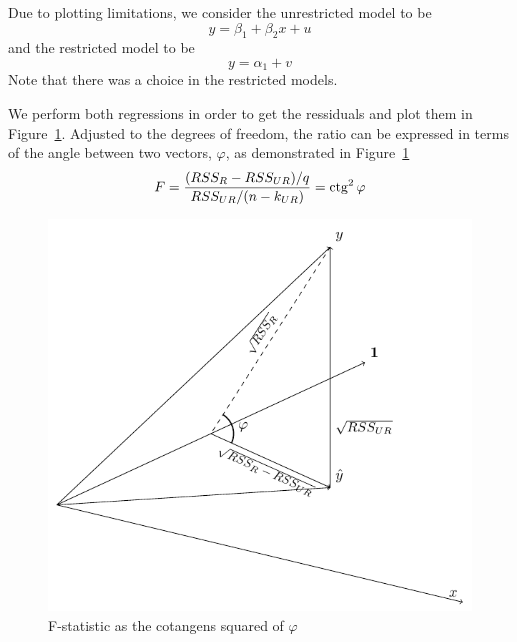 Due to plotting limitations, we consider the unrestricted model to be
\[
y = \beta_1 + \beta_2 x + u
\]
and the restricted model to be
\[
y = \alpha_1 + v
\]
Note that there was a choice in the restricted models.

We perform both regressions in order to get the ressiduals and plot them
in Figure~\ref{fig:ftest}.
Adjusted to the degrees of freedom, the ratio can be expressed in terms of the
angle between two vectors, $\varphi$, as demonstrated in Figure~\ref{fig:ftest}
\[
F = \frac{(RSS_{R} - RSS_{UR})/q}{RSS_{UR}/(n-k_{UR})} = \operatorname{ctg}^2 \varphi
\]

\begin{figure}
\centering
\includegraphics[width=0.55\linewidth]{figures/04_ftest.pdf}
\caption{F-statistic as the cotangens squared of $\varphi$}
\label{fig:ftest}
\end{figure}
